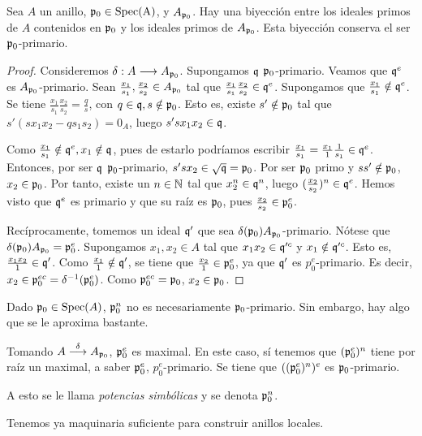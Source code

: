 \documentclass[../main.tex]{subfiles}
\begin{document}
\begin{proposition}
Sea $A$ un anillo, $\mathfrak{p}_0\in \operatorname{Spec(A)}$, y $A_{\mathfrak{p}_0}$. Hay una biyección entre los ideales primos de $A$ contenidos en $\mathfrak{p}_0$ y los ideales primos de $A_{\mathfrak{p}_0}$. Esta biyección conserva el ser $\mathfrak{p}_0$-primario.
\end{proposition}
\begin{proof}
Consideremos $\delta:A\longrightarrow A_{\mathfrak{p}_0}$. Supongamos $\mathfrak{q}$ $\mathfrak{p}_0$-primario. Veamos que $\mathfrak{q}^e$ es $A_{\mathfrak{p}_0}$-primario. Sean $\frac{x_1}{s_1},\frac{x_2}{s_2}\in A_{\mathfrak{p}_0}$ tal que $\frac{x_1}{s_1}\frac{x_2}{s_2}\in\mathfrak{q}^e$. Supongamos que $\frac{x_1}{s_1}\notin\mathfrak{q}^e$. Se tiene $\frac{x_1}{s_1}\frac{x_2}{s_2}=\frac{q}{s}$, con $q\in\mathfrak{q}, s\notin\mathfrak{p}_0$. Esto es, existe $s'\notin\mathfrak{p}_0$ tal que $s'(sx_1x_2-qs_1s_2)=0_A$, luego $s'sx_1x_2\in\mathfrak{q}$.

Como $\frac{x_1}{s_1}\notin \mathfrak{q}^e, x_1\notin\mathfrak{q}$, pues de estarlo podríamos escribir $\frac{x_1}{s_1}=\frac{x_1}{1}\frac{1}{s_1}\in\mathfrak{q}^e$. Entonces, por ser $\mathfrak{q}$ $\mathfrak{p}_0$-primario, $s'sx_2\in\sqrt{\mathfrak{q}}=\mathfrak{p}_0$. Por ser $\mathfrak{p}_0$ primo y $ss'\notin\mathfrak{p}_0$, $x_2\in\mathfrak{p}_0$. Por tanto, existe un $n\in\mathbb{N}$ tal que $x_2^n\in\mathfrak{q}^n$, luego $(\frac{x_2}{s_2})^n\in\mathfrak{q}^e$. Hemos visto que $\mathfrak{q}^e$ es primario y que su raíz es $\mathfrak{p}_0$, pues $\frac{x_2}{s_2}\in\mathfrak{p}_0^e$.

Recíprocamente, tomemos un ideal $\mathfrak{q}'$ que sea $\delta(\mathfrak{p}_0)A_{\mathfrak{p}_0}$-primario. Nótese que $\delta(\mathfrak{p}_0)A_{\mathfrak{p}_0}=\mathfrak{p}_0^e$. Supongamos $x_1,x_2\in A$ tal que $x_1x_2\in\mathfrak{q}'^c$ y $x_1\notin\mathfrak{q}'^c$. Esto es, $\frac{x_1x_2}{1}\in\mathfrak{q}'$. Como $\frac{x_1}{1}\notin\mathfrak{q}'$, se tiene que $\frac{x_2}{1}\in\mathfrak{p}_0^e$, ya que $\mathfrak{q}'$ es $p_0^e$-primario. Es decir, $x_2\in\mathfrak{p}_0^{ec}= \delta^{-1}(\mathfrak{p}_0^e)$. Como $\mathfrak{p}_0^{ec}=\mathfrak{p}_0$, $x_2\in\mathfrak{p}_0$.
\end{proof}
\begin{remark}
Dado $\mathfrak{p}_0\in\operatorname{Spec}(A)$, $\mathfrak{p}_0^n$ no es necesariamente $\mathfrak{p}_0$-primario. Sin embargo, hay algo que se le aproxima bastante.

Tomando $A\overset{\delta}{\longrightarrow}A_{\mathfrak{p}_0}$, $\mathfrak{p}_0^e$ es maximal. En este caso, sí tenemos que $(\mathfrak{p}_0^e)^n$ tiene por raíz un maximal, a saber $\mathfrak{p}_0^e$, $p_0^e$-primario. Se tiene que $((\mathfrak{p}_0^e)^n)^e$ es $\mathfrak{p}_0$-primario.

A esto se le llama \textit{potencias simbólicas} y se denota $\mathfrak{p}_0^n$.
\end{remark}
Tenemos ya maquinaria suficiente para construir anillos locales.
\end{document}
